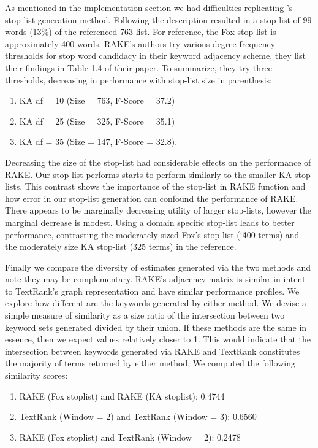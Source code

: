 \documentclass[11pt,a4paper]{article}
\begin{document}
As mentioned in the implementation section we had difficulties replicating \citet{1}'s stop-list generation method. Following the description resulted in a stop-list of 99 words (13\%) of the referenced 763 list. For reference, the Fox stop-list is approximately 400 words. RAKE's authors try various degree-frequency thresholds for stop word candidacy in their keyword adjacency scheme, they list their findings in Table 1.4 of their paper. To summarize, they try three thresholds, decreasing in performance with stop-list size in parenthesis: 
\begin{enumerate}
	\small \itemsep0em 

	\item KA df = 10 (Size = 763, F-Score = 37.2)
	\item KA df = 25 (Size = 325, F-Score = 35.1)
	\item KA df = 35 (Size = 147, F-Score = 32.8).
	
\normalsize
\end{enumerate}  

Decreasing the size of the stop-list had considerable effects on the performance of RAKE. Our stop-list performs starts to perform similarly to the smaller KA stop-lists.  This contrast shows the importance of the stop-list in RAKE function and how error in our stop-list generation can confound the performance of RAKE. There appears to be marginally decreasing utility of larger stop-lists, however the marginal decrease is modest. Using a domain specific stop-list leads to better performance, contrasting the moderately sized Fox's stop-list (\char`\~400 terms) and the moderately size KA stop-list (325 terms) in the reference. 

Finally we compare the diversity of estimates generated via the two methods and note they may be complementary. RAKE's adjacency matrix is similar in intent to TextRank's graph representation and have similar performance profiles. We explore how different are the keywords generated by either method. We devise a simple measure of similarity as a size ratio of the intersection between two keyword sets generated divided by their union. If these methods are the same in essence, then we expect values relatively closer to 1. This would indicate that the intersection between keywords generated via RAKE and TextRank constitutes the majority of terms returned by either method. We computed the following similarity scores:
\begin{enumerate}
	\small \itemsep0em 

	\item RAKE (Fox stoplist) and RAKE (KA stoplist): 0.4744
	\item TextRank (Window = 2) and TextRank (Window = 3):  0.6560
	\item RAKE (Fox stoplist) and TextRank (Window = 2): 0.2478
\normalsize
\end{enumerate}  
\end{document}
